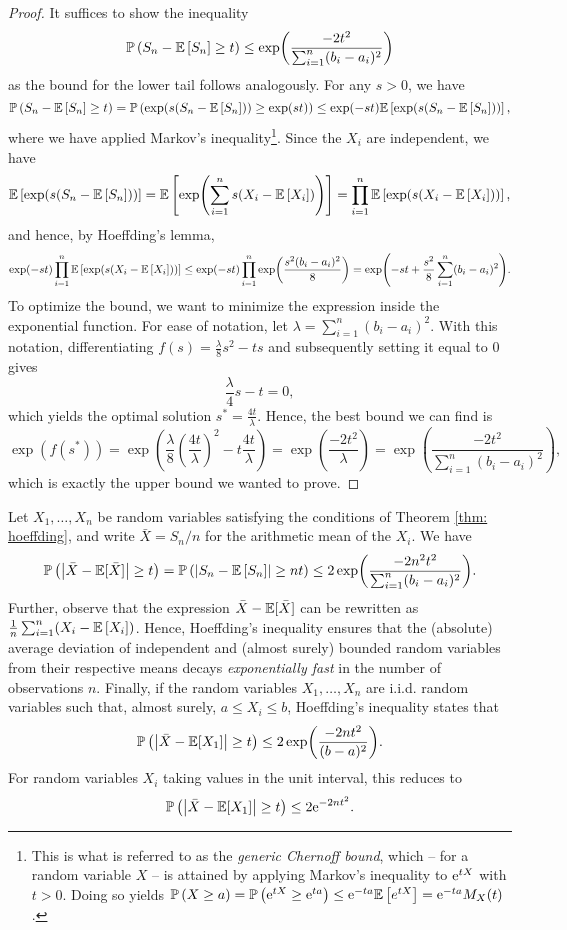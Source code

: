 \begin{proof}
It suffices to show the inequality
\[
    \mathbb{P}\left(S_n - \mathbb{E}\left[S_n\right] \geq t\right) \leq \exp(\frac{-2t^2}{\sum_{i=1}^n (b_i - a_i)^2})
\]
as the bound for the lower tail follows analogously. For any $s>0$, we have
\[
    \mathbb{P}\left(S_n - \mathbb{E}\left[S_n\right] \geq t\right) = \mathbb{P}\left(\exp(s(S_n - \mathbb{E}\left[S_n\right])) \geq \exp(st)\right) \leq \exp(-st) \mathbb{E}\left[\exp(s(S_n - \mathbb{E}\left[S_n\right]))\right],
\]
where we have applied Markov's inequality\footnote{This is what is referred to as the \emph{generic Chernoff bound}, which -- for a random variable $X$ -- is attained by applying Markov's inequality to $\mathrm{e}^{tX}$ with $t > 0$. Doing so yields $\mathbb{P}\left(X \geq a\right) = \mathbb{P}\left(\mathrm{e}^{tX} \geq \mathrm{e}^{ta}\right) \leq \mathrm{e}^{-ta} \mathbb{E}\left[e^{tX}\right] = \mathrm{e}^{-ta} M_X(t)$.}. Since the $X_i$ are independent, we have
\[
    \mathbb{E}\left[\exp(s(S_n - \mathbb{E}\left[S_n\right]))\right] = \mathbb{E}\left[\exp(\sum_{i=1}^n s(X_i - \mathbb{E}\left[X_i\right]))\right] = \prod_{i=1}^n \mathbb{E}\left[\exp(s(X_i - \mathbb{E}\left[X_i\right]))\right],
\]
and hence, by Hoeffding's lemma,
\[
    \exp(-st) \prod_{i=1}^n \mathbb{E}\left[\exp(s(X_i - \mathbb{E}\left[X_i\right]))\right] \leq \exp(-st) \prod_{i=1}^n \exp(\frac{s^2 (b_i-a_i)^2}{8}) = \exp(-st + \frac{s^2}{8} \sum_{i=1}^n (b_i-a_i)^2).
\]
To optimize the bound, we want to minimize the expression inside the exponential function. For ease of notation, let $\lambda = \sum_{i=1}^n (b_i-a_i)^2$. With this notation, differentiating $f(s) = \frac{\lambda}{8} s^2 -ts$ and subsequently setting it equal to $0$ gives
\[
    \frac{\lambda}{4} s - t = 0,
\]
which yields the optimal solution $s^* = \frac{4t}{\lambda}$. Hence, the best bound we can find is
\[
    \exp(f(s^*)) = \exp(\frac{\lambda}{8} \left(\frac{4t}{\lambda}\right)^2 - t \frac{4t}{\lambda}) = \exp(\frac{-2t^2}{\lambda}) = \exp(\frac{-2t^2}{\sum_{i=1}^n (b_i - a_i)^2}),
\]
which is exactly the upper bound we wanted to prove.
\end{proof}

\begin{remark}
Let $X_1, \dots, X_n$ be random variables satisfying the conditions of Theorem \ref{thm: hoeffding}, and write $\bar X = S_n/n$ for the arithmetic mean of the $X_i$. We have
\[
    \mathbb{P}\left(\abs{\bar X - \mathbb{E}[\bar X]} \geq t\right) = \mathbb{P}\left(\abs{S_n - \mathbb{E}\left[S_n\right]} \geq nt\right) \leq 2 \exp(\frac{-2n^2t^2}{\sum_{i=1}^n (b_i - a_i)^2}).
\]
Further, observe that the expression $\bar X - \mathbb{E}[\bar X]$ can be rewritten as $\frac{1}{n} \sum_{i=1}^n (X_i - \mathbb{E}\left[X_i\right])$. Hence, Hoeffding's inequality ensures that the (absolute) average deviation of independent and (almost surely) bounded random variables from their respective means decays \emph{exponentially fast} in the number of observations $n$. Finally, if the random variables $X_1, \dots, X_n$ are i.i.d. random variables such that, almost surely, $a \leq X_i \leq b$, Hoeffding's inequality states that
\[
    \mathbb{P}\left(\abs{\bar X - \mathbb{E}[X_1]} \geq t\right) \leq 2 \exp(\frac{-2nt^2}{(b - a)^2}).
\]
For random variables $X_i$ taking values in the unit interval, this reduces to
\[
    \mathbb{P}\left(\abs{\bar X - \mathbb{E}[X_1]} \geq t\right) \leq 2 \mathrm{e}^{-2nt^2}.
\]
\end{remark}
